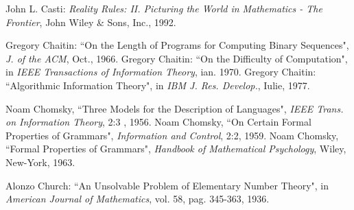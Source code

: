 {\begin{thebibliography}{}



 John L. Casti: {\em Reality Rules: II. Picturing the World in Mathematics - The Frontier}, John Wiley \& Sons, Inc., 1992.


 Gregory Chaitin: ``On the Length of Programs for Computing Binary Sequences", {\em J. of the ACM}, Oct., 1966.
 Gregory Chaitin: ``On the Difficulty of Computation", in {\em IEEE Transactions of Information Theory}, ian. 1970.
 Gregory Chaitin: ``Algorithmic Information Theory",  in {\em IBM J. Res. Develop.}, Iulie, 1977.


 Noam Chomsky, ``Three Models for the Description of Languages", {\em IEEE
Trans. on Information Theory}, 2:3 , 1956.
 Noam Chomsky, ``On Certain Formal Properties of Grammars", {\em
Information and Control}, 2:2, 1959.
 Noam Chomsky, ``Formal Properties of Grammars", {\em Handbook of
Mathematical Psychology}, Wiley, New-York, 1963.

 Alonzo Church: ``An Unsolvable Problem of Elementary
Number Theory", in {\em American Journal of Mathematics}, vol. 58,
pag. 345-363,
 1936.


\end{thebibliography}}
